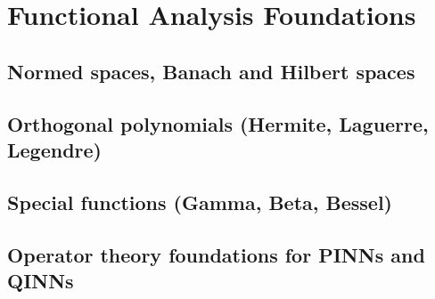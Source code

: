 ﻿\chapter{Functional Analysis Foundations}
\section{Normed spaces, Banach and Hilbert spaces}

\section{Orthogonal polynomials (Hermite, Laguerre, Legendre)}

\section{Special functions (Gamma, Beta, Bessel)}

\section{Operator theory foundations for PINNs and QINNs}


